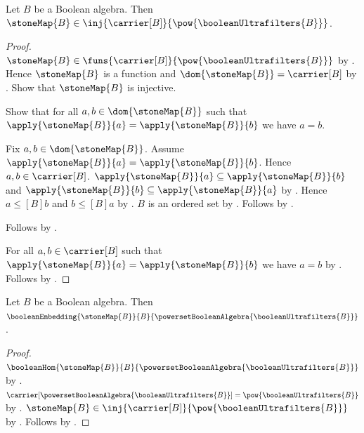 \begin{theorem}\label{stone_map_injective}
    Let $B$ be a Boolean algebra.
    Then $\stoneMap{B}\in
        \inj{\carrier[B]}{\pow{\booleanUltrafilters{B}}}$.
\end{theorem}
\begin{proof}
    $\stoneMap{B}\in
        \funs{\carrier[B]}{\pow{\booleanUltrafilters{B}}}$ by
        .
    Hence $\stoneMap{B}$ is a function and
        $\dom{\stoneMap{B}}=\carrier[B]$ by
        .
    Show that $\stoneMap{B}$ is injective.
    \begin{subproof}
        Show that for all $a,b\in\dom{\stoneMap{B}}$ such that
            $\apply{\stoneMap{B}}{a}=\apply{\stoneMap{B}}{b}$
            we have $a=b$.
        \begin{subproof}
            Fix $a,b\in\dom{\stoneMap{B}}$.
            Assume $\apply{\stoneMap{B}}{a}=
                \apply{\stoneMap{B}}{b}$.
            Hence $a,b\in\carrier[B]$.
            $\apply{\stoneMap{B}}{a}
                \subseteq\apply{\stoneMap{B}}{b}$ and
                $\apply{\stoneMap{B}}{b}
                \subseteq\apply{\stoneMap{B}}{a}$ by
                .
            Hence $a\mathrel{\leq[B]}b$ and
                $b\mathrel{\leq[B]}a$ by
                .
            $B$ is an ordered set by
                .
            Follows by
                .
        \end{subproof}
        Follows by .
    \end{subproof}
    For all $a,b\in\carrier[B]$ such that
        $\apply{\stoneMap{B}}{a}=\apply{\stoneMap{B}}{b}$
        we have $a=b$ by .
    Follows by .
\end{proof}

\begin{theorem}\label{stone_map_is_boolean_embedding}
    Let $B$ be a Boolean algebra.
    Then $\booleanEmbedding
        {\stoneMap{B}}
        {B}
        {\powersetBooleanAlgebra{\booleanUltrafilters{B}}}$.
\end{theorem}
\begin{proof}
    $\booleanHom
        {\stoneMap{B}}
        {B}
        {\powersetBooleanAlgebra{\booleanUltrafilters{B}}}$ by
        .
    $\carrier[\powersetBooleanAlgebra{\booleanUltrafilters{B}}]
        =\pow{\booleanUltrafilters{B}}$ by
        .
    $\stoneMap{B}\in
        \inj{\carrier[B]}
            {\pow{\booleanUltrafilters{B}}}$ by
        .
    Follows by .
\end{proof}

